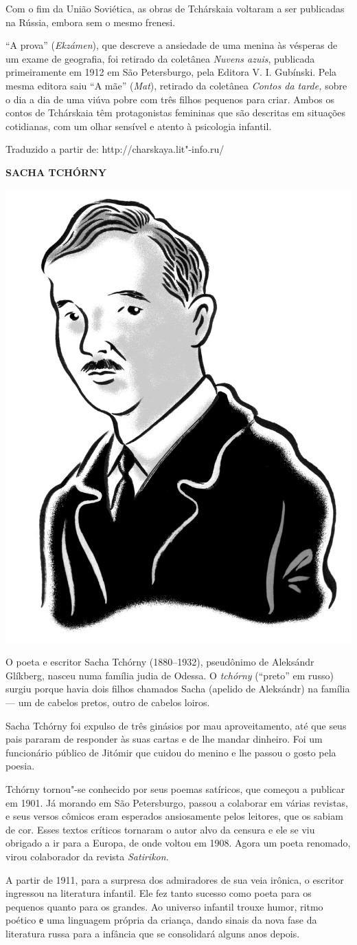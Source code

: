 Com o fim da União Soviética, as obras de Tchárskaia voltaram a ser
publicadas na Rússia, embora sem o mesmo frenesi.

``A prova'' (\emph{Ekzámen}), que descreve a ansiedade de uma
menina às vésperas de um exame de geografia, foi retirado da coletânea
\emph{Nuvens azuis}, publicada primeiramente em 1912 em São Petersburgo,
pela Editora V. I. Gubínski. Pela mesma editora saiu ``A mãe''
(\emph{Mat}), retirado da coletânea \emph{Contos da tarde,} sobre o dia
a dia de uma viúva pobre com três filhos pequenos para criar. Ambos os
contos de Tchárskaia têm protagonistas femininas que são descritas em situações
cotidianas, com um olhar sensível e atento à psicologia infantil.

Traduzido a partir de: http://charskaya.lit"-info.ru/

\pagebreak
\noindent\textbf{SACHA TCHÓRNY}\medskip

\noindent\includegraphics[width=.8in]{./imgs/autor11.jpg}

\noindent{}O poeta e escritor Sacha Tchórny (1880--1932), pseudônimo de Aleksándr
Glíkberg, nasceu numa família judia de Odessa. O \emph{tchórny}
(``preto'' em russo) surgiu porque havia dois filhos chamados Sacha
(apelido de Aleksándr) na família --- um de cabelos pretos, outro de
cabelos loiros.

Sacha Tchórny foi expulso de três ginásios por mau aproveitamento, até
que seus pais pararam de responder às suas cartas e de lhe mandar
dinheiro. Foi um funcionário público de Jitómir que cuidou do menino e
lhe passou o gosto pela poesia.

Tchórny tornou"-se conhecido por seus poemas satíricos, que começou a
publicar em 1901. Já morando em São Petersburgo, passou a colaborar em
várias revistas, e seus versos cômicos eram esperados ansiosamente pelos
leitores, que os sabiam de cor. Esses textos críticos tornaram o autor
alvo da censura e ele se viu obrigado a ir para a Europa, de onde voltou
em 1908. Agora um poeta renomado, virou colaborador da revista
\emph{Satirikon.}

A partir de 1911, para a surpresa dos admiradores de sua veia irônica, o
escritor ingressou na literatura infantil. Ele fez tanto sucesso como
poeta para os pequenos quanto para os grandes. Ao universo infantil
trouxe humor, ritmo poético е uma linguagem própria da criança, dando
sinais da nova fase da literatura russa para a infância que se
consolidará alguns anos depois.

